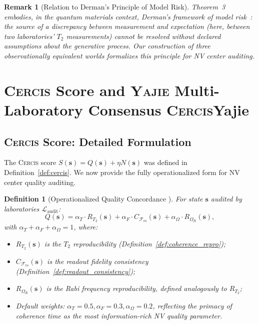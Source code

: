 \documentclass[11pt,a4paper]{article}
\newtheorem{definition}[theorem]{Definition}
\newtheorem{remark}[theorem]{Remark}
\theoremstyle{definition}
\newcommand{\Yajie}{\textsc{Yajie}}
\newcommand{\Cercis}{\textsc{Cercis}}
\newcommand{\cL}{\mathcal{L}}
\newcommand{\Ttwo}{T_2}
\newcommand{\NV}{NV}
\newcommand{\RabiFreq}{\Omega_R}
\newcommand{\FidReadout}{\mathcal{F}_{\text{ro}}}
\begin{document}
\begin{remark}[Relation to Derman's Principle of Model Risk]
Theorem~3 embodies, in the quantum materials context, Derman's framework
of model risk~\cite{derman1996model}: the source of a discrepancy between
measurement and expectation (here, between two laboratories' $\Ttwo$
measurements) cannot be resolved without declared assumptions about the
generative process. Our construction of three observationally equivalent
worlds formalizes this principle for \NV{} center auditing.
\end{remark}

\section{\Cercis{} Score and \Yajie{} Multi-Laboratory Consensus \Cercis Yajie}
\label{sec:cercis}

\subsection{\Cercis{} Score: Detailed Formulation}

The \Cercis{} score $S(\mathbf{s}) = Q(\mathbf{s}) + \eta N(\mathbf{s})$ was
defined in Definition~\ref{def:cercis}. We now provide the fully operationalized
form for \NV{} center quality auditing.

\begin{definition}[Operationalized Quality Concordance ]
\label{def:Q_operational}
For state $\mathbf{s}$ audited by laboratories $\cL_{\text{audit}}$:
\begin{equation}
    Q(\mathbf{s}) = \alpha_T \cdot R_{\Ttwo}(\mathbf{s})
                 + \alpha_F \cdot C_{\FidReadout}(\mathbf{s})
                 + \alpha_\Omega \cdot R_{\RabiFreq}(\mathbf{s}),
    \label{eq:Q_full}
\end{equation}
with $\alpha_T + \alpha_F + \alpha_\Omega = 1$, where:
\begin{itemize}[nosep]
    \item $R_{\Ttwo}(\mathbf{s})$ is the $\Ttwo$ reproducibility
    (Definition~\ref{def:coherence_repro});
    \item $C_{\FidReadout}(\mathbf{s})$ is the readout fidelity consistency
    (Definition~\ref{def:readout_consistency});
    \item $R_{\RabiFreq}(\mathbf{s})$ is the Rabi frequency reproducibility,
    defined analogously to $R_{\Ttwo}$;
    \item Default weights: $\alpha_T = 0.5, \alpha_F = 0.3, \alpha_\Omega = 0.2$,
    reflecting the primacy of coherence time as the most information-rich
    \NV{} quality parameter.
\end{itemize}
\end{definition}
\end{document}

